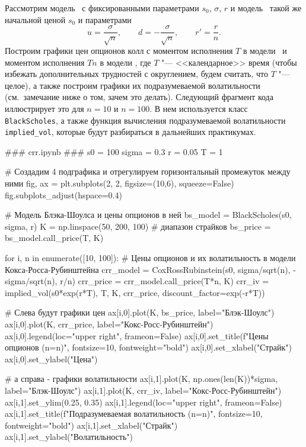 Рассмотрим модель \bs\ с фиксированными параметрами $s_0$, $\sigma$, $r$ и модель \crr\ такой же начальной ценой $s_0$ и параметрами
\[
u = \frac{\sigma}{\sqrt n}, \qquad d = -\frac{\sigma}{\sqrt n}, \qquad r' = \frac{r}{n}.
\]
Построим графики цен опционов колл с моментом исполнения $T$ в модели \bs\ и моментом исполнения $Tn$ в модели \crr, где $T$ "--- <<календарное>> время (чтобы избежать дополнительных трудностей с округлением, будем считать, что $T$ "--- целое), а также построим графики их подразумеваемой волатильности (см.~замечание ниже о том, зачем это делать).
Следующий фрагмент кода иллюстрирует это для $n=10$ и $n=100$.
В нем используется класс \verb"BlackScholes", а также функция вычисления подразумеваемой волатильности \verb"implied_vol", которые будут разбираться в дальнейших практикумах.
\begin{python}
### crr.ipynb ###
s0 = 100
sigma = 0.3
r = 0.05
T = 1

# Создадим 4 подграфика и отрегулируем горизонтальный промежуток между ними
fig, ax = plt.subplots(2, 2, figsize=(10,6), squeeze=False)
fig.subplots_adjust(hspace=0.4)

# Модель Блэка-Шоулса и цены опционов в ней
bs_model = BlackScholes(s0, sigma, r)     
K = np.linspace(50, 200, 100)   # диапазон страйков
bs_price = bs_model.call_price(T, K)

for i, n in enumerate([10, 100]):
    # Цены опционов и их волатильность в модели Кокса-Росса-Рубинштейна
    crr_model = CoxRossRubinstein(s0, sigma/sqrt(n), -sigma/sqrt(n), r/n)
    crr_price = crr_model.call_price(T*n, K)
    crr_iv = implied_vol(s0*exp(r*T), T, K, crr_price, discount_factor=exp(-r*T))

    # Слева будут графики цен
    ax[i,0].plot(K, bs_price, label="Блэк-Шоулс")
    ax[i,0].plot(K, crr_price, label="Кокс-Росс-Рубинштейн")
    ax[i,0].legend(loc="upper right", frameon=False)
    ax[i,0].set_title(f"Цены опционов (n={n})", fontsize=10, fontweight="bold")
    ax[i,0].set_xlabel("Страйк")
    ax[i,0].set_ylabel("Цена")

    # а справа - графики волатильности
    ax[i,1].plot(K, np.ones(len(K))*sigma, label="Блэк-Шоулс")
    ax[i,1].plot(K, crr_iv, label="Кокс-Росс-Рубинштейн")
    ax[i,1].set_ylim(0.25, 0.35)
    ax[i,1].legend(loc="upper right", frameon=False)
    ax[i,1].set_title(f"Подразумеваемая волатильность (n={n})", fontsize=10,
        fontweight="bold")
    ax[i,1].set_xlabel("Страйк")
    ax[i,1].set_ylabel("Волатильность")
\end{python}

